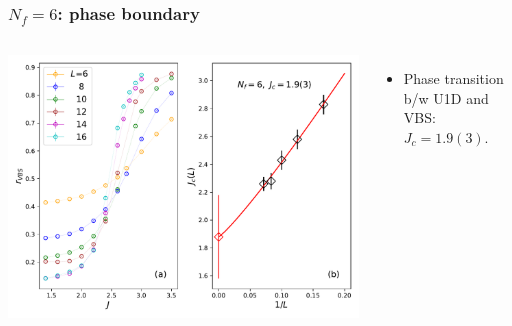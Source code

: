 \documentclass[xcolor=table, 10pt, aspectratio=43]{beamer}
\begin{document}
\begin{frame}
  \frametitle{$N_f=6$: phase boundary}
  \begin{columns}
    \includegraphics[width=\textwidth]{../u1sl/n6rvbs}
		\begin{itemize}
			\item Phase transition b/w U1D and VBS: $J_c=1.9(3)$.
		\end{itemize}
  \end{columns}
\end{frame}
\end{document}
